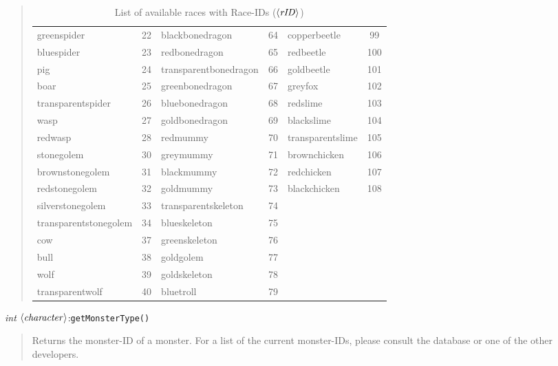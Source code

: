 \documentclass[a4paper,10pt,makeidx]{scrreprt}
\newcommand{\com}[2]{\index{#1}\texttt{#1(}#2\texttt{)}}
\newcommand{\var}[1]{$\left\langle \text{\emph{#1}} \right\rangle$}
\newcommand{\integer}{\textsl{int }}
\begin{document}
\begin{quote}
\begin{table}
\begin{tabular}{lc|lc|lc}
    greenspider & 22 & blackbonedragon & 64 & copperbeetle & 99\\
    bluespider & 23 & redbonedragon & 65 & redbeetle & 100\\
    pig & 24 & transparentbonedragon & 66 & goldbeetle & 101\\
    boar & 25 & greenbonedragon & 67 & greyfox & 102\\
    transparentspider & 26 & bluebonedragon & 68 & redslime & 103\\
    wasp & 27 & goldbonedragon & 69 & blackslime & 104\\
    redwasp & 28 & redmummy & 70 & transparentslime & 105\\
    stonegolem & 30 & greymummy & 71 & brownchicken & 106\\
    brownstonegolem & 31 & blackmummy & 72 & redchicken & 107\\
    redstonegolem & 32 & goldmummy & 73 & blackchicken & 108\\
    silverstonegolem & 33 & transparentskeleton & 74 &  & \\
    transparentstonegolem & 34 & blueskeleton & 75 &  & \\
    cow & 37 & greenskeleton & 76 &  & \\
    bull & 38 & goldgolem & 77 &  & \\
    wolf & 39 & goldskeleton & 78 &  & \\
    transparentwolf & 40 & bluetroll & 79 &  & \\
\end{tabular}
\caption{List of available races with Race-IDs (\var{rID})}\label{raceIDs}
\end{table}
\end{quote}
\integer \var{character}:\com{getMonsterType}{}
\begin{quote}
       Returns the monster-ID of a monster. For a list of the current monster-IDs, please consult the database or one of the other developers.
\end{quote}
\end{document}
